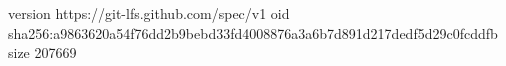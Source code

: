 version https://git-lfs.github.com/spec/v1
oid sha256:a9863620a54f76dd2b9bebd33fd4008876a3a6b7d891d217dedf5d29c0fcddfb
size 207669
